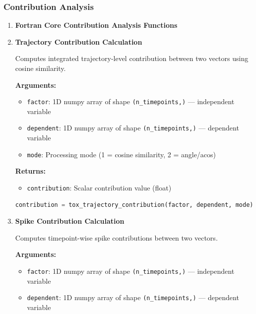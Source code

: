 \documentclass[11pt]{article}
\begin{document}
\subsubsection{Contribution Analysis}
\begin{enumerate}
	\item \textbf{Fortran Core Contribution Analysis Functions}
	      
	\item \textbf{Trajectory Contribution Calculation}
	      
	      Computes integrated trajectory-level contribution between two vectors using
	      cosine similarity.
	      
	      \textbf{Arguments:}
	      \begin{itemize}
	      	\item \texttt{factor}: 1D numpy array of shape \texttt{(n\_timepoints,)}
	      	      — independent variable
	      	      
	      	\item \texttt{dependent}: 1D numpy array of shape \texttt{(n\_timepoints,)}
	      	      — dependent variable
	      	      
	      	\item \texttt{mode}: Processing mode (1 = cosine similarity, 2 = angle/acos)
	      \end{itemize}
	      \textbf{Returns:}
	      \begin{itemize}
	      	\item \texttt{contribution}: Scalar contribution value (float)
	      \end{itemize}
	      \begin{lstlisting}[language=Python, caption={Trajectory-Level Contribution Calculation}]
contribution = tox_trajectory_contribution(factor, dependent, mode)
	      \end{lstlisting}
	      
	\item \textbf{Spike Contribution Calculation}
	      
	      Computes timepoint-wise spike contributions between two vectors.
	      
	      \textbf{Arguments:}
	      \begin{itemize}
	      	\item \texttt{factor}: 1D numpy array of shape \texttt{(n\_timepoints,)}
	      	      — independent variable
	      	      
	      	\item \texttt{dependent}: 1D numpy array of shape \texttt{(n\_timepoints,)}
	      	      — dependent variable
	      	      

\end{itemize}
\end{enumerate}
\end{document}
